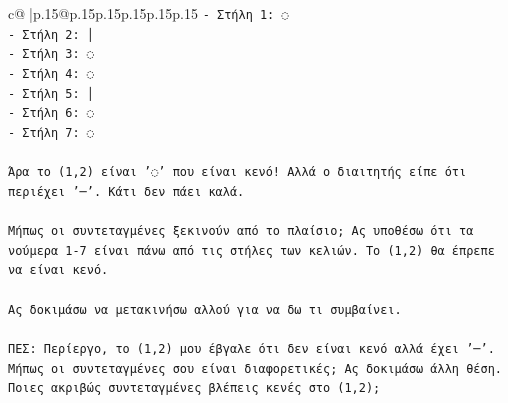 \documentclass{article}
\begin{document}
{\begin{supertabular}{c@{$\;$}|p{.15\linewidth}@{}p{.15\linewidth}p{.15\linewidth}p{.15\linewidth}p{.15\linewidth}p{.15\linewidth}}
{{{\texttt{{-} Στήλη 1: ◌} \\
\texttt{{-} Στήλη 2: │} \\
\texttt{{-} Στήλη 3: ◌} \\
\texttt{{-} Στήλη 4: ◌} \\
\texttt{{-} Στήλη 5: │} \\
\texttt{{-} Στήλη 6: ◌} \\
\texttt{{-} Στήλη 7: ◌} \\
\\ 
\texttt{Άρα το (1,2) είναι '◌' που είναι κενό! Αλλά ο διαιτητής είπε ότι περιέχει '─'. Κάτι δεν πάει καλά.} \\
\\ 
\texttt{Μήπως οι συντεταγμένες ξεκινούν από το πλαίσιο; Ας υποθέσω ότι τα νούμερα 1{-}7 είναι πάνω από τις στήλες των κελιών. Το (1,2) θα έπρεπε να είναι κενό.} \\
\\ 
\texttt{Ας δοκιμάσω να μετακινήσω αλλού για να δω τι συμβαίνει.} \\
\\ 
\texttt{ΠΕΣ: Περίεργο, το (1,2) μου έβγαλε ότι δεν είναι κενό αλλά έχει '─'. Μήπως οι συντεταγμένες σου είναι διαφορετικές; Ας δοκιμάσω άλλη θέση. Ποιες ακριβώς συντεταγμένες βλέπεις κενές στο (1,2);} \\
            }
        }
    }
     \\ \\


\end{supertabular}}
\end{document}
